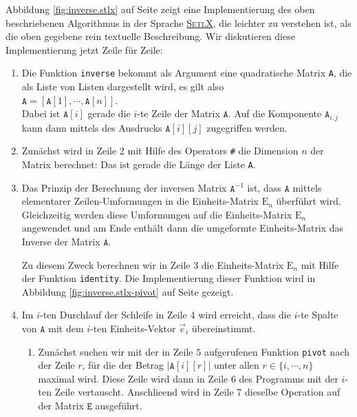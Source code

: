 Abbildung \ref{fig:inverse.stlx} auf Seite \pageref{fig:inverse.stlx} zeigt eine Implementierung des oben beschriebenen Algorithmus in
der Sprache \href{http://randoom.org/Software/SetlX}{\textsc{SetlX}}, 
die leichter zu verstehen ist, als die oben gegebene rein textuelle Beschreibung.  Wir diskutieren
diese Implementierung jetzt Zeile f\"{u}r Zeile:
\begin{enumerate}
\item Die Funktion \texttt{inverse} bekommt als Argument eine quadratische Matrix \texttt{A}, die 
      als Liste von Listen dargestellt wird, es gilt also
      \\[0.2cm]
      \hspace*{1.3cm}
      $\mathtt{A} = [\mathtt{A}[1], \cdots, \mathtt{A}[n]]$.
      \\[0.2cm]
      Dabei ist $\mathtt{A}[i]$ gerade die $i$-te Zeile der Matrix $\mathtt{A}$.  Auf die Komponente
      $\mathtt{A}_{i,j}$ kann dann mittels des Ausdrucks $\mathtt{A}[i][j]$ zugegriffen werden.
\item Zun\"{a}chst wird in Zeile 2 mit Hilfe des Operators \texttt{\#}
      die Dimension $n$ der Matrix berechnet: Das ist gerade die L\"{a}nge der
      Liste \texttt{A}.
\item Das Prinzip der Berechnung der inversen Matrix $\mathtt{A}^{-1}$ ist, dass $\mathtt{A}$
      mittels elementarer Zeilen-Umformungen in die Einheits-Matrix $\mathrm{E}_n$ \"{u}berf\"{u}hrt wird.
      Gleichzeitig werden diese Umformungen auf die Einheits-Matrix $\mathrm{E}_n$ angewendet
      und am Ende enth\"{a}lt dann die umgeformte Einheits-Matrix das Inverse der Matrix $\mathtt{A}$.
 
      Zu diesem Zweck berechnen wir in Zeile 3 die Einheits-Matrix $\mathrm{E}_n$ mit Hilfe der
      Funktion \texttt{identity}.  Die Implementierung dieser Funktion wird in Abbildung
      \ref{fig:inverse.stlx-pivot} auf Seite \pageref{fig:inverse.stlx-pivot} gezeigt.
\item Im $i$-ten Durchlauf der Schleife in Zeile 4 wird erreicht, dass die $i$-te Spalte von
      $\mathtt{A}$ mit dem $i$-ten Einheits-Vektor $\vec{e}_i$ \"{u}bereinstimmt.
      \begin{enumerate}
      \item Zun\"{a}chst suchen wir mit der in Zeile $5$ aufgerufenen Funktion \texttt{pivot}
            nach der Zeile $r$, f\"{u}r die der Betrag $|\mathtt{A}[i][r]|$ unter allen 
            $r \in \{i, \cdots,n \}$ maximal wird.  Diese Zeile wird dann in Zeile 6 des Programms mit der $i$-ten Zeile
            vertauscht.  Anschlie\3end wird in Zeile 7 dieselbe Operation auf der Matrix $\mathtt{E}$ ausgef\"{u}hrt.


\end{enumerate}
\end{enumerate}
